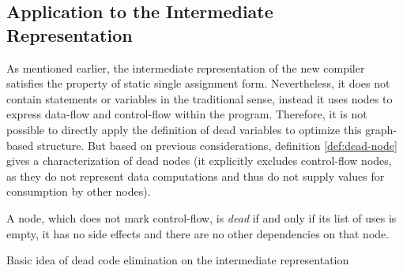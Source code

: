 \subsection{Application to the Intermediate Representation}
\label{sec:dead-code:application-to-the-ir}

As mentioned earlier, the intermediate representation of the new compiler satisfies the property of static single assignment form. Nevertheless, it does not contain statements or variables in the traditional sense, instead it uses nodes to express data-flow and control-flow within the program. Therefore, it is not possible to directly apply the definition of dead variables to optimize this graph-based structure. But based on previous considerations, definition \ref{def:dead-node} gives a characterization of dead nodes (it explicitly excludes control-flow nodes, as they do not represent data computations and thus do not supply values for consumption by other nodes).

\begin{definition}\label{def:dead-node}
A node, which does not mark control-flow, is \emph{dead} if and only if its list of uses is empty, it has no side effects and there are no other dependencies on that node.
\end{definition}

\begin{algorithm}
\caption{Basic idea of dead code elimination on the intermediate representation}
\label{alg:dead-ir-basic}
\begin{algorithmic}[1]
\EndWhile
\end{algorithmic}
\end{algorithm}


